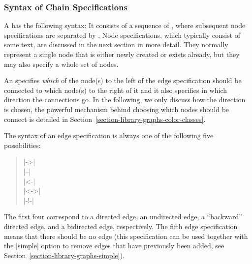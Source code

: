 \subsubsection{Syntax of Chain Specifications}

A  has the following syntax: It consists of a
sequence of , where subsequent node specifications
are separated by . Node specifications, which
typically consist of some text, are discussed in the next section in more
detail. They normally represent a single node that is either newly created or
exists already, but they may also specify a whole set of nodes.

An  specifies \emph{which} of the node(s) to the left
of the edge specification should be connected to which node(s) to the right of
it and it also specifies in which direction the connections go. In the
following, we only discuss how the direction is chosen, the powerful mechanism
behind choosing which nodes should be connect is detailed in
Section~\ref{section-library-graphs-color-classes}.

The syntax of an edge specification is always one of the following five
possibilities:
%
\begin{quote}
    |->| \\
    |--| \\
    |<-| \\
    |<->| \\
    |-!-| 
\end{quote}

The first four correspond to a directed edge, an undirected edge, a
``backward'' directed edge, and a bidirected edge, respectively. The fifth edge
specification means that there should be no edge (this specification can be
used together with the |simple| option to remove edges that have previously
been added, see Section~\ref{section-library-graphs-simple}).

